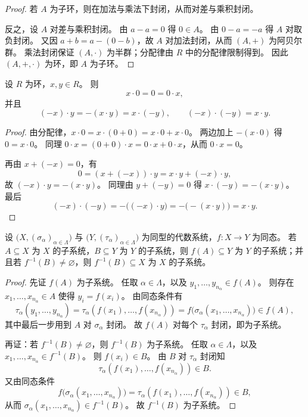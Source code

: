 \documentclass[lang=cn,a4paper,newtx]{elegantbook}
\begin{document}
\begin{proof}
若 $A$ 为子环，则在加法与乘法下封闭，从而对差与乘积封闭。

反之，设 $A$ 对差与乘积封闭。
由 $a-a=0$ 得 $0\in A$。
由 $0-a=-a$ 得 $A$ 对取负封闭。
又因 $a+b=a-(0-b)$，故 $A$ 对加法封闭，从而 $(A,+)$ 为阿贝尔群。
乘法封闭保证 $(A,\cdot)$ 为半群；分配律由 $R$ 中的分配律限制得到。
因此 $(A,+,\cdot)$ 为环，即 $A$ 为子环。
\end{proof}

\begin{proposition}
设 $R$ 为环，$x,y\in R$。
则
\[
  x\cdot 0=0=0\cdot x,
\]
并且
\[
  (-x)\cdot y=-(x\cdot y)=x\cdot (-y),\qquad (-x)\cdot (-y)=x\cdot y.
\]
\end{proposition}

\begin{proof}
由分配律，$x\cdot 0=x\cdot(0+0)=x\cdot 0+x\cdot 0$。
两边加上 $-(x\cdot 0)$ 得 $0=x\cdot 0$。
同理 $0\cdot x=(0+0)\cdot x=0\cdot x+0\cdot x$，从而 $0\cdot x=0$。

再由 $x+(-x)=0$，有
\[
  0=(x+(-x))\cdot y=x\cdot y+(-x)\cdot y,
\]
故 $(-x)\cdot y=-(x\cdot y)$。
同理由 $y+(-y)=0$ 得 $x\cdot (-y)=-(x\cdot y)$。
最后
\[
  (-x)\cdot (-y)=-\bigl((-x)\cdot y\bigr)=-\bigl(-(x\cdot y)\bigr)=x\cdot y.
\]
\end{proof}

\begin{proposition}
设 $\bigl(X,(\sigma_{\alpha})_{\alpha\in\Lambda}\bigr)$ 与 $\bigl(Y,(\tau_{\alpha})_{\alpha\in\Lambda}\bigr)$ 为同型的代数系统，$f:X\to Y$ 为同态。
若 $A\subseteq X$ 为 $X$ 的子系统，$B\subseteq Y$ 为 $Y$ 的子系统，则 $f(A)\subseteq Y$ 为 $Y$ 的子系统；并且若 $f^{-1}(B)\neq\varnothing$，则 $f^{-1}(B)\subseteq X$ 为 $X$ 的子系统。
\end{proposition}

\begin{proof}
先证 $f(A)$ 为子系统。
任取 $\alpha\in\Lambda$，以及 $y_1,\dots,y_{n_{\alpha}}\in f(A)$。
则存在 $x_1,\dots,x_{n_{\alpha}}\in A$ 使得 $y_i=f(x_i)$。
由同态条件有
\[
  \tau_{\alpha}(y_1,\dots,y_{n_{\alpha}})=\tau_{\alpha}(f(x_1),\dots,f(x_{n_{\alpha}}))=f\bigl(\sigma_{\alpha}(x_1,\dots,x_{n_{\alpha}})\bigr)\in f(A),
\]
其中最后一步用到 $A$ 对 $\sigma_{\alpha}$ 封闭。
故 $f(A)$ 对每个 $\tau_{\alpha}$ 封闭，即为子系统。

再证：若 $f^{-1}(B)\neq\varnothing$，则 $f^{-1}(B)$ 为子系统。
任取 $\alpha\in\Lambda$，以及 $x_1,\dots,x_{n_{\alpha}}\in f^{-1}(B)$。
则 $f(x_i)\in B$。
由 $B$ 对 $\tau_{\alpha}$ 封闭知
\[
  \tau_{\alpha}(f(x_1),\dots,f(x_{n_{\alpha}}))\in B.
\]
又由同态条件
\[
  f\bigl(\sigma_{\alpha}(x_1,\dots,x_{n_{\alpha}})\bigr)=\tau_{\alpha}(f(x_1),\dots,f(x_{n_{\alpha}}))\in B,
\]
从而 $\sigma_{\alpha}(x_1,\dots,x_{n_{\alpha}})\in f^{-1}(B)$。
故 $f^{-1}(B)$ 为子系统。
\end{proof}
\end{document}
